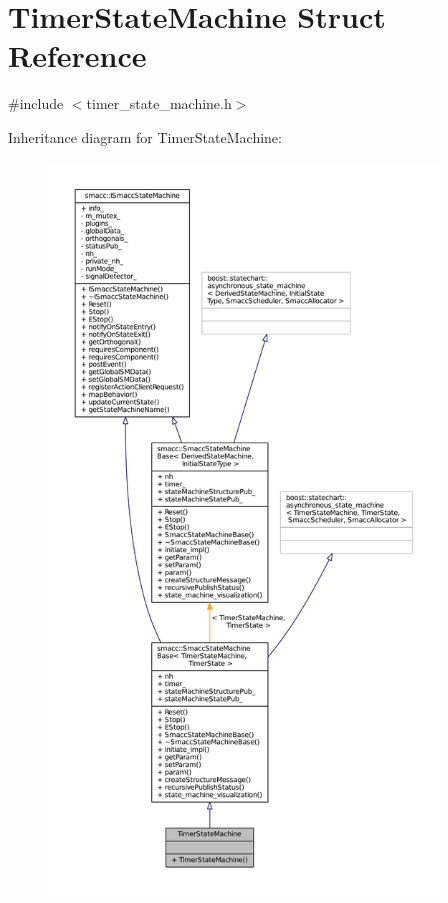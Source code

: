\hypertarget{structTimerStateMachine}{}\section{Timer\+State\+Machine Struct Reference}
\label{structTimerStateMachine}


{\ttfamily \#include $<$timer\+\_\+state\+\_\+machine.\+h$>$}



Inheritance diagram for Timer\+State\+Machine\+:
\nopagebreak
\begin{figure}[H]
\begin{center}
\leavevmode
\includegraphics[height=550pt]{structTimerStateMachine__inherit__graph}
\end{center}
\end{figure}


